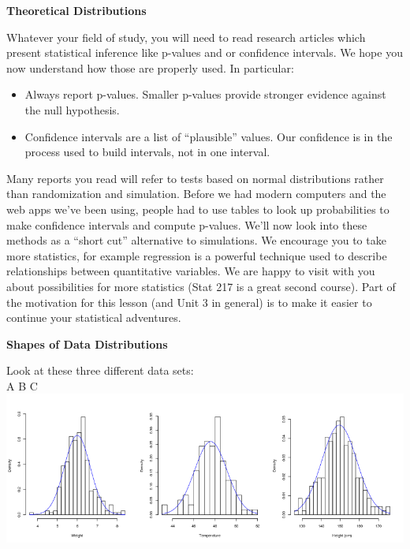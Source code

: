 \def\theTopic{Normal and t Distributions }
\def\dayNum{21 }

 \begin{center}
 {\bf {\large Theoretical Distributions}}
 \end{center}

  Whatever your field of study, you will need to read  research
  articles which present statistical inference like p-values and or
  confidence intervals.  We hope you now understand how those are
  properly used. In particular:
  \begin{itemize}
  \item Always report p-values. Smaller p-values provide stronger
    evidence against the null hypothesis.
  \item Confidence intervals are a list of ``plausible'' values.
    Our confidence is in the process used to build intervals, not
    in one interval. 
  \end{itemize}

  Many reports you read will refer to tests based on normal
  distributions rather than randomization and simulation.
  Before we had modern computers and the web apps we've been using,
  people had to use tables to look up probabilities to make confidence
  intervals and compute p-values.  We'll now look into these methods
  as a ``short cut'' alternative to simulations.
  We encourage you to take more statistics, for example regression 
  is a powerful technique used to describe relationships between
  quantitative variables.    We are happy to visit with you
  about possibilities for more statistics (Stat 217 is a great second
  course).  Part of the motivation for this lesson (and Unit 3 in
  general)  is to make it easier to
  continue your statistical adventures.

 
 \begin{center}
   {\Large\bf  Shapes of Data Distributions}
 \end{center}

  Look at these three different data sets:\\
\hspace*{2.6cm}A  \hspace*{5cm}B  \hspace*{4.5cm}C \\
\includegraphics[width=.9\linewidth]{plots/normals.png}

